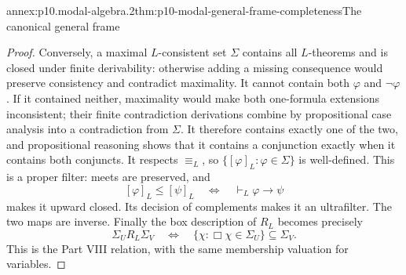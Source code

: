 \begin{annexitem}{annex:p10.modal-algebra.2}{thm:p10-modal-general-frame-completeness}{The canonical general frame}
\begin{proof}
Conversely, a maximal \(L\)-consistent set \(\Sigma\)
contains all \(L\)-theorems and is closed under finite
derivability: otherwise adding a missing consequence would
preserve consistency and contradict maximality.
It cannot contain both \(\varphi\) and \(\neg\varphi\).
If it contained neither, maximality would make both one-formula
extensions inconsistent; their finite contradiction derivations
combine by propositional case analysis into a contradiction
from \(\Sigma\).
It therefore contains exactly one of the two, and propositional
reasoning shows that it contains a conjunction exactly when it
contains both conjuncts.
It respects \(\equiv_L\), so
\(\{[\varphi]_L:\varphi\in\Sigma\}\) is well-defined.
This is a proper filter: meets are preserved, and
\[
 [\varphi]_L\leq[\psi]_L
      \quad\Longleftrightarrow\quad
      \vdash_L\varphi\to\psi
\]
makes it upward closed.
Its decision of complements makes it an ultrafilter.
The two maps are inverse.
Finally the box description of \(R_L\) becomes precisely
\[
 \Sigma_U R_L\Sigma_V
 \quad\Longleftrightarrow\quad
 \{\chi:\Box\chi\in\Sigma_U\}\subseteq\Sigma_V.
\]
This is the Part VIII relation, with the same membership
valuation for variables.
\end{proof}
\end{annexitem}

